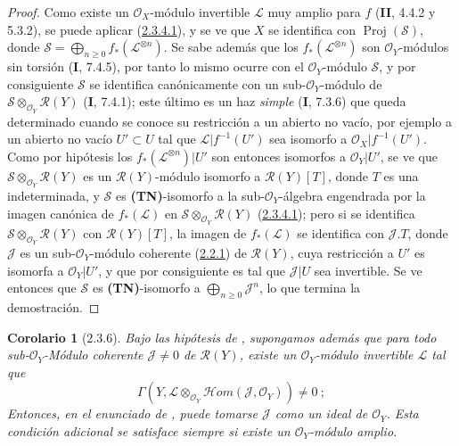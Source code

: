 \documentclass[10pt,oneside,openany]{book}
\theoremstyle{egaenv}\newtheorem*{env}{---}
\theoremstyle{egastatement}
\newtheorem*{corollary}{Corolario}
\theoremstyle{egadescription}
\renewcommand{\geq}{\geqslant}
\begin{document}
\begin{proof}
Como existe un $\mathcal O_X$-módulo invertible $\mathcal L$ muy amplio para $f$ (\textbf{II}, 4.4.2 y 5.3.2), se puede aplicar (\hyperref[III.2.3.4.1-fr]{2.3.4.1}), y se ve que $X$ se identifica con $\operatorname{Proj}(\mathcal S)$, donde $\mathcal S=\bigoplus_{n\geq0}f_*(\mathcal L^{\otimes n})$. Se sabe además que los $f_*(\mathcal L^{\otimes n})$ son $\mathcal O_Y$-módulos sin torsión (\textbf{I}, 7.4.5), por tanto lo mismo ocurre con el $\mathcal O_Y$-módulo $\mathcal S$, y por consiguiente $\mathcal S$ se identifica canónicamente con un sub-$\mathcal O_Y$-módulo de $\mathcal S\otimes_{\mathcal O_Y}\mathcal R(Y)$ (\textbf{I}, 7.4.1); este último es un haz \emph{simple} (\textbf{I}, 7.3.6) que queda determinado cuando se conoce su restricción a un abierto no vacío, por ejemplo a un abierto no vacío $U'\subset U$ tal que $\mathcal L|f^{-1}(U')$ sea isomorfo a $\mathcal O_X|f^{-1}(U')$. Como por hipótesis los $f_*(\mathcal L^{\otimes n})|U'$ son entonces isomorfos a $\mathcal O_Y|U'$, se ve que $\mathcal S\otimes_{\mathcal O_Y}\mathcal R(Y)$ es un $\mathcal R(Y)$-módulo isomorfo a $\mathcal R(Y)[T]$, donde $T$ es una indeterminada, y $\mathcal S$ es \textbf{(TN)}-isomorfo a la sub-$\mathcal O_Y$-álgebra engendrada por la imagen canónica de $f_*(\mathcal L)$ en $\mathcal S\otimes_{\mathcal O_Y}\mathcal R(Y)$ (\hyperref[III.2.3.4.1-fr]{2.3.4.1}); pero si se identifica $\mathcal S\otimes_{\mathcal O_Y}\mathcal R(Y)$ con $\mathcal R(Y)[T]$, la imagen de $f_*(\mathcal L)$ se identifica con $\mathcal J.T$, donde $\mathcal J$ es un sub-$\mathcal O_Y$-módulo coherente (\hyperref[III.2.2.1-fr]{2.2.1}) de $\mathcal R(Y)$, cuya restricción a $U'$ es isomorfa a $\mathcal O_Y|U'$, y que por consiguiente es tal que $\mathcal J|U$ sea invertible. Se ve entonces que $\mathcal S$ es \textbf{(TN)}-isomorfo a $\bigoplus_{n\geq0}\mathcal J^n$, lo que termina la demostración.
\end{proof}

\begin{corollary}[2.3.6]
\label{III.2.3.6}
\label{III.2.3.6-fr}
Bajo las hipótesis de \textup{}, supongamos además que para todo sub-$\mathcal O_Y$-Módulo coherente
$\mathcal J\neq0$ de $\mathcal R(Y)$, existe un
$\mathcal O_Y$-módulo invertible $\mathcal L$ tal que
\[
\Gamma(Y,\mathcal L\otimes_{\mathcal O_Y}
\mathcal{H}om(\mathcal J,\mathcal O_Y))\neq0~;
\]
Entonces, en el enunciado de \textup{}, puede tomarse $\mathcal J$ como un ideal de $\mathcal O_Y$.
Esta condición adicional se satisface siempre si existe un $\mathcal O_Y$-módulo amplio.
\end{corollary}
\end{document}
